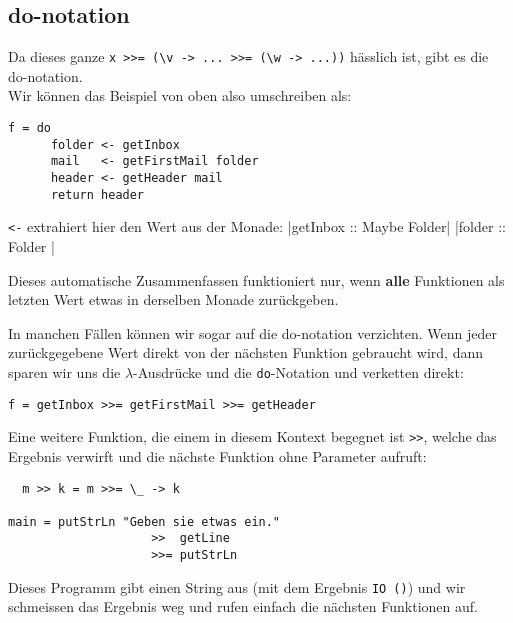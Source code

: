 \documentclass{beamer}
\begin{document}
\subsection{do-notation}
\begin{frame}[fragile]
Da dieses ganze \texttt{x >>= (\textbackslash v -> ... >>= (\textbackslash w -> ...))} hässlich ist, gibt es die do-notation.\\
Wir können das Beispiel von oben also umschreiben als:
\pause
\begin{verbatim}
f = do
      folder <- getInbox
      mail   <- getFirstMail folder
      header <- getHeader mail
      return header
\end{verbatim}
\pause
\texttt{<-} extrahiert hier den Wert \glqq aus der Monade\grqq :
|getInbox :: Maybe Folder|
|folder   :: Folder      |
\pause
\begin{important}Dieses automatische Zusammenfassen funktioniert nur, wenn \textbf{alle} Funktionen als letzten Wert etwas in derselben Monade zurückgeben.\end{important}
\end{frame}

\begin{frame}[fragile]
In manchen Fällen können wir sogar auf die do-notation verzichten. Wenn jeder zurückgegebene Wert direkt von der nächsten Funktion gebraucht wird, dann sparen wir uns die $\lambda$-Ausdrücke und die \texttt{do}-Notation und verketten direkt:
\pause
\begin{verbatim}
f = getInbox >>= getFirstMail >>= getHeader
\end{verbatim}
\pause
Eine weitere Funktion, die einem in diesem Kontext begegnet ist \texttt{>>}, welche das Ergebnis verwirft und die nächste Funktion ohne Parameter aufruft:
\begin{verbatim}
  m >> k = m >>= \_ -> k                    

main = putStrLn "Geben sie etwas ein."
                    >>  getLine 
                    >>= putStrLn
\end{verbatim}
\pause
Dieses Programm gibt einen String aus (mit dem Ergebnis \texttt{IO ()}) und wir schmeissen das Ergebnis weg und rufen einfach die nächsten Funktionen auf.
\end{frame}
\end{document}
